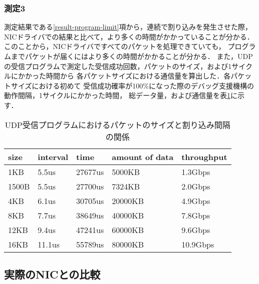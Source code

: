 \documentclass[submit,techreq,noauthor,dvipdfmx]{ipsj}
\begin{document}
\subsubsection{測定3}

測定結果である\ref{result-program-limit}項から，連続で割り込みを発生させた際，
NICドライバでの結果と比べて，より多くの時間がかかっていることが分かる．
このことから，NICドライバですべてのパケットを処理できていても，
プログラムまでパケットが届くにはより多くの時間がかかることが分かる．
また，UDPの受信プログラムで測定した受信成功回数，パケットのサイズ，および1サイクルにかかった時間から
各パケットサイズにおける通信量を算出した．各パケットサイズにおける初めて
受信成功確率が100\%になった際のデバッグ支援機構の動作間隔，1サイクルにかかった時間，
総データ量，および通信量を表\ref{table:program}に示す．

\begin{table}[h]
    \caption{UDP受信プログラムにおけるパケットのサイズと割り込み間隔の関係}
    \label{table:program}
    \begin{center}
        \begin{tabular}{l|l|l|l|l}   \hline \hline 
            size    & interval      & time      & amount of data   & throughput       \\ \hline
            1KB      & 5.5us            & 27677us              & 5000KB       & 1.3Gbps            \\ 
            1500B    & 5.5us            & 27700us              & 7324KB       & 2.0Gbps            \\ 
            4KB      & 6.1us            & 30705us              & 20000KB      & 4.9Gbps            \\ 
            8KB      & 7.7us            & 38649us              & 40000KB      & 7.8Gbps            \\ 
            12KB     & 9.4us            & 47241us              & 60000KB      & 9.6Gbps            \\ 
            16KB     & 11.1us           & 55789us              & 80000KB      & 10.9Gbps           \\ \hline
        \end{tabular}
    \end{center}
\end{table}

\subsection{実際のNICとの比較}
\end{document}
